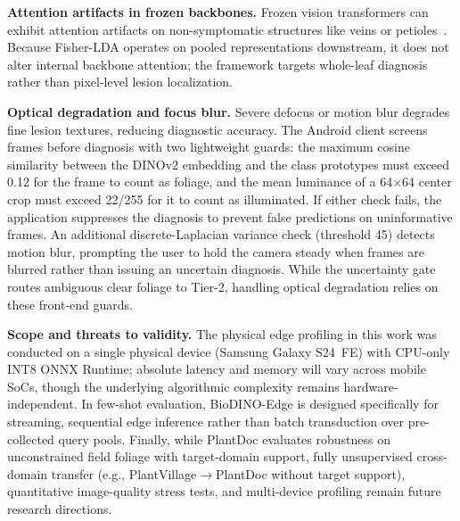 \documentclass[preprint,12pt]{elsarticle}
\begin{document}
\textbf{Attention artifacts in frozen backbones.} Frozen vision transformers can exhibit attention artifacts on non-symptomatic structures like veins or petioles~\cite{darcet2024vision}. Because Fisher-LDA operates on pooled representations downstream, it does not alter internal backbone attention; the framework targets whole-leaf diagnosis rather than pixel-level lesion localization.

\textbf{Optical degradation and focus blur.} Severe defocus or motion blur degrades fine lesion textures, reducing diagnostic accuracy. The Android client screens frames before diagnosis with two lightweight guards: the maximum cosine similarity between the DINOv2 embedding and the class prototypes must exceed 0.12 for the frame to count as foliage, and the mean luminance of a 64$\times$64 center crop must exceed 22/255 for it to count as illuminated. If either check fails, the application suppresses the diagnosis to prevent false predictions on uninformative frames. An additional discrete-Laplacian variance check (threshold 45) detects motion blur, prompting the user to hold the camera steady when frames are blurred rather than issuing an uncertain diagnosis. While the uncertainty gate routes ambiguous clear foliage to Tier-2, handling optical degradation relies on these front-end guards.

\textbf{Scope and threats to validity.} The physical edge profiling in this work was conducted on a single physical device (Samsung Galaxy S24~FE) with CPU-only INT8 ONNX Runtime; absolute latency and memory will vary across mobile SoCs, though the underlying algorithmic complexity remains hardware-independent. In few-shot evaluation, BioDINO-Edge is designed specifically for streaming, sequential edge inference rather than batch transduction over pre-collected query pools. Finally, while PlantDoc evaluates robustness on unconstrained field foliage with target-domain support, fully unsupervised cross-domain transfer (e.g., PlantVillage$\rightarrow$PlantDoc without target support), quantitative image-quality stress tests, and multi-device profiling remain future research directions.



\end{document}
